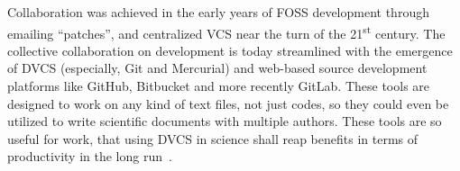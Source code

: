












 Collaboration was achieved in the early years of FOSS
development through emailing ``patches'', and centralized VCS near the turn of
the 21\textsuperscript{st} century.  The collective collaboration on
development is today streamlined with the emergence of DVCS (especially, Git
and Mercurial) and web-based source development platforms like GitHub,
Bitbucket and more recently GitLab.
%
These tools are designed to work on any kind of text files, not just codes, so
they could even be utilized to write scientific documents with multiple authors.
%
These tools are so useful for work, that using DVCS in science shall reap
benefits in terms of productivity in the long run~\cite{wilson_best_2014}.

